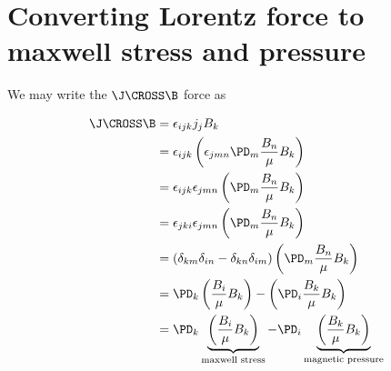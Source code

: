 \documentclass[11pt]{article}
\begin{document}
\doublespacing
\MOONSTITLE
\maketitle

\section{Converting Lorentz force to maxwell stress and pressure}
We may write the $\J\CROSS \B$ force as

\begin{equation}
\begin{aligned}
	\J\CROSS \B
	&= \epsilon_{ijk} j_j B_k \\
	&= \epsilon_{ijk} \left( \epsilon_{jmn} \PD_m \frac{B_n}{\mu} B_k \right) \\
	&= \epsilon_{ijk} \epsilon_{jmn} \left( \PD_m \frac{B_n}{\mu} B_k \right) \\
	&= \epsilon_{jki} \epsilon_{jmn} \left( \PD_m \frac{B_n}{\mu} B_k \right) \\
	&= (\delta_{km} \delta_{in} - \delta_{kn} \delta_{im} ) \left( \PD_m \frac{B_n}{\mu} B_k \right) \\
	&= \PD_k \left( \frac{B_i}{\mu} B_k \right) - \left( \PD_i \frac{B_k}{\mu} B_k \right) \\
	&= \PD_k \underbrace{\left( \frac{B_i}{\mu} B_k \right)}_{\text{maxwell stress}} - \PD_i \underbrace{\left( \frac{B_k}{\mu} B_k \right)}_{\text{magnetic pressure}} \\
\end{aligned}
\end{equation}
\end{document}
